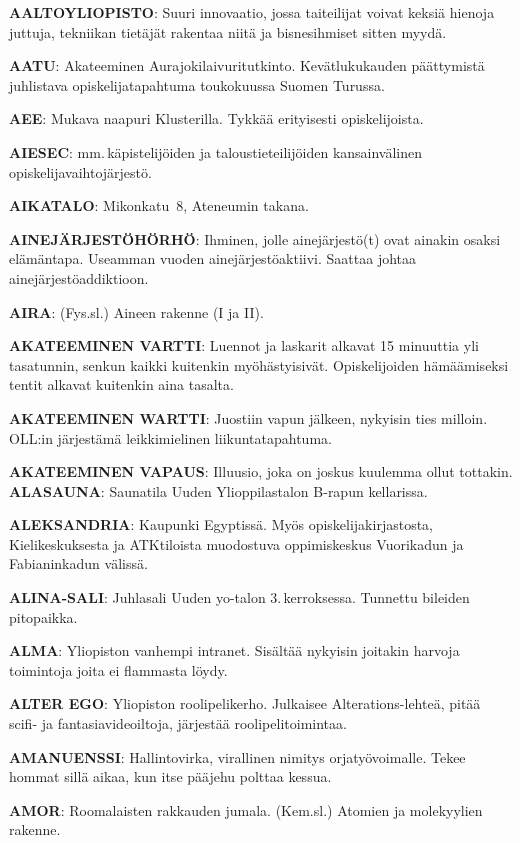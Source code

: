 \documentclass[../ala_hataile.tex]{subfiles}
\begin{document}
\raggedright
\textbf{AALTOYLIOPISTO}: Suuri innovaatio,
jossa taiteilijat voivat keksiä hienoja juttuja,
tekniikan tietäjät rakentaa niitä ja bisnesihmiset
sitten myydä.

\textbf{AATU}: Akateeminen Aurajokilaivuritutkinto.
Kevätlukukauden päättymistä juhlistava
opiskelijatapahtuma toukokuussa
Suomen Turussa.

\textbf{AEE}: Mukava naapuri Klusterilla. Tykkää
erityisesti opiskelijoista.

\textbf{AIESEC}: mm.\,käpistelijöiden ja taloustieteilijöiden
kansainvälinen opiskelijavaihtojärjestö.

\textbf{AIKATALO}: Mikonkatu~8, Ateneumin
takana.

\textbf{AINEJÄRJESTÖHÖRHÖ}: Ihminen,
jolle ainejärjestö(t) ovat ainakin osaksi
elämäntapa. Useamman vuoden ainejärjestöaktiivi.
Saattaa johtaa ainejärjestöaddiktioon.

\textbf{AIRA}: (Fys.sl.) Aineen rakenne (I ja II).

\textbf{AKATEEMINEN VARTTI}: Luennot ja
laskarit alkavat 15 minuuttia yli tasatunnin,
senkun kaikki kuitenkin myöhästyisivät.
Opiskelijoiden hämäämiseksi tentit alkavat
kuitenkin aina tasalta.

\textbf{AKATEEMINEN WARTTI}: Juostiin
vapun jälkeen, nykyisin ties milloin.
OLL:in järjestämä leikkimielinen liikuntatapahtuma.

\textbf{AKATEEMINEN VAPAUS}: Illuusio,
joka on joskus kuulemma ollut tottakin.
\textbf{ALASAUNA}: Saunatila Uuden Ylioppilastalon
B-rapun kellarissa.

\textbf{ALEKSANDRIA}: Kaupunki Egyptissä.
Myös opiskelijakirjastosta, Kielikeskuksesta
ja ATKtiloista muodostuva oppimiskeskus
Vuorikadun ja Fabianinkadun välissä.

\textbf{ALINA-SALI}: Juhlasali Uuden yo-talon
3.\,kerroksessa. Tunnettu bileiden pitopaikka.

\textbf{ALMA}: Yliopiston vanhempi intranet. Sisältää
nykyisin joitakin harvoja toimintoja
joita ei flammasta löydy.

\textbf{ALTER EGO}: Yliopiston roolipelikerho.
Julkaisee Alterations-lehteä, pitää scifi- ja
fantasiavideoiltoja, järjestää roolipelitoimintaa.

\textbf{AMANUENSSI}: Hallintovirka, virallinen
nimitys orjatyövoimalle. Tekee hommat
sillä aikaa, kun itse pääjehu polttaa kessua.

\textbf{AMOR}: Roomalaisten rakkauden jumala.
(Kem.sl.) Atomien ja molekyylien rakenne.
\end{document}
